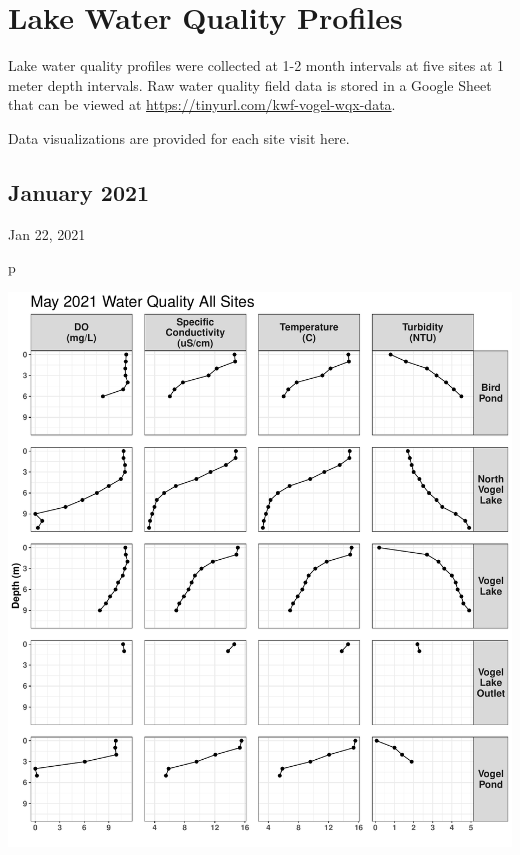 \documentclass[
]{book}
\newenvironment{Shaded}{\begin{snugshade}}{\end{snugshade}}
\newcommand{\NormalTok}[1]{#1}
\begin{document}
\hypertarget{lake-water-quality-profiles}{%
\chapter{Lake Water Quality Profiles}\label{lake-water-quality-profiles}}

Lake water quality profiles were collected at 1-2 month intervals at five sites at 1 meter depth intervals. Raw water quality field data is stored in a Google Sheet that can be viewed at \url{https://tinyurl.com/kwf-vogel-wqx-data}.

Data visualizations are provided for each site visit here.

\hypertarget{january-2021}{%
\section{January 2021}\label{january-2021}}

Jan 22, 2021

\begin{Shaded}
\begin{Highlighting}[]
\NormalTok{p}
\end{Highlighting}
\end{Shaded}

\includegraphics{Miller_Creek_Vogel_Lake_Water_Quality_files/figure-latex/unnamed-chunk-6-1.pdf}
\end{document}
